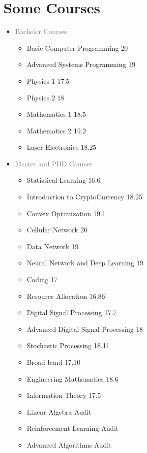 \documentclass[10pt,a4paper,sans]{moderncv} %
\begin{document}
\section{Some Courses}

\begin{multicols}{2}  %
\begin{itemize}
\item \textcolor{gray}{Bachelor Courses}
\begin{itemize}
\item Basic Computer Programming            \hfill{20}  
\item{Advanced Systems Programming}			\hfill{19}
\item Physics 1 \hfill{17.5}
\item Physics 2 \hfill{18}
\item Mathematics 1 \hfill{18.5}
\item Mathematics 2 \hfill{19.2}
\item Laser Electronics \hfill{18.25}
\end{itemize}
\item \textcolor{gray}{Master and PHD Courses}
\begin{itemize}
\item Statistical Learning \hfill{16.6}
\item Introduction to CryptoCurrency  \hfill{18.25}
\item Convex Optimization \hfill{19.1}
\item Cellular Network \hfill{20}
\item Data Network \hfill{19}
\item Neural Network and Deep Learning  \hfill{19}
\item Coding \hfill{17}
\item Resource Allocation \hfill{16.86}
\item Digital Signal Processing                                \hfill{17.7} 
\item Advanced Digital Signal Processing                                \hfill{18} 
\item Stochastic Processing         \hfill{18.11}
\item Broad band         \hfill{17.10} 
\item Engineering Mathematics           \hfill{18.6} 
\item Information Theory       \hfill{17.5} 
\item Linear Algebra \hfill{Audit}
\item Reinforcement Learning  \hfill{Audit}
\item Advanced Algorithms \hfill{Audit}
\end{itemize}
\end{itemize}
\end{multicols}
\end{document}
